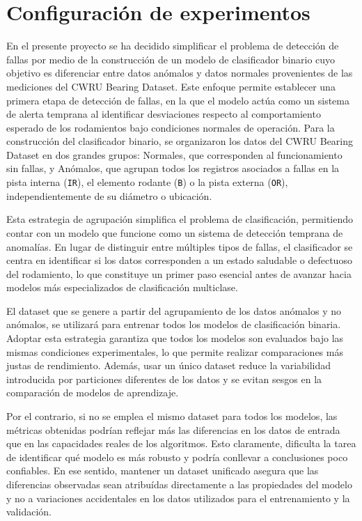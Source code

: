 \documentclass[11pt,a4paper,spanish]{book}
\numberwithin{equation}{chapter}
\numberwithin{figure}{chapter}
\begin{document}
\section{Configuración de experimentos}

En el presente proyecto se ha decidido simplificar el problema de detección de fallas 
por medio de la construcción de un modelo de clasificador binario cuyo objetivo es 
diferenciar entre datos anómalos y datos normales provenientes de las mediciones del 
CWRU Bearing Dataset. Este enfoque permite establecer una primera etapa de detección de 
fallas, en la que el modelo actúa como un sistema de alerta temprana al identificar 
desviaciones respecto al comportamiento esperado de los rodamientos bajo condiciones 
normales de operación.
Para la construcción del clasificador binario, se organizaron los datos del CWRU Bearing 
Dataset en dos grandes grupos: Normales, que corresponden al funcionamiento sin fallas, 
y Anómalos,  que agrupan todos los registros asociados a fallas en la pista interna 
(\texttt{IR}), el elemento rodante (\texttt{B}) o la pista externa (\texttt{OR}), 
independientemente de su diámetro o ubicación.


Esta estrategia de agrupación simplifica el problema de clasificación, permitiendo 
contar con un modelo que funcione como un sistema de detección temprana de anomalías. 
En lugar de distinguir entre múltiples tipos de fallas, el clasificador se centra en 
identificar si los datos corresponden a un estado saludable o defectuoso del rodamiento,
lo que constituye un primer paso esencial antes de avanzar hacia modelos más 
especializados de clasificación multiclase.


El dataset que se genere a partir del agrupamiento de los datos anómalos y no anómalos, 
se utilizará para entrenar todos los modelos de clasificación binaria. 
Adoptar esta estrategia garantiza que todos los modelos son evaluados bajo las mismas 
condiciones experimentales, lo que permite realizar comparaciones más justas de rendimiento. 
Además, usar un único dataset reduce la variabilidad introducida por particiones 
diferentes de los datos y se evitan sesgos en la comparación de modelos de aprendizaje.


Por el contrario, si no se emplea el mismo dataset para todos los modelos, las métricas 
obtenidas podrían reflejar más las diferencias en los datos de entrada que en las 
capacidades reales de los algoritmos. Esto claramente, dificulta la tarea de identificar 
qué modelo es más robusto y podría conllevar a conclusiones poco confiables. 
En ese sentido, mantener un dataset unificado asegura que las diferencias observadas 
sean atribuídas directamente a las propiedades del modelo y no a variaciones 
accidentales en los datos utilizados para el entrenamiento y la validación.
\end{document}

